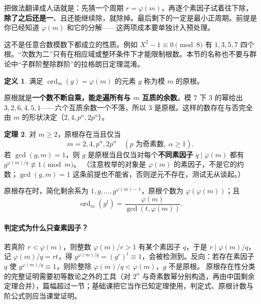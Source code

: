 \documentclass[UTF8,a4paper,11pt,twoside,openright,fontset=fandol]{ctexbook}
\theoremstyle{definition}
\newtheorem{definition}{定义}[chapter]
\newtheorem{theorem}[definition]{定理}
\newcommand{\ord}{\operatorname{ord}}
\begin{document}
\begin{tip}
把做法翻译成人话就是：先猜一个周期 $r=\varphi(m)$，再逐个素因子试着往下除，\textbf{除了之后还是一}、且还能继续除，就除掉。最后剩下的一定是最小正周期。前提是你已经知道 $\varphi(m)$ 和它的分解——这两项成本要单独计入预处理。
\end{tip}


\begin{pitfall}
这不是任意合数模数下都成立的性质。例如 $X^2-1\equiv0\pmod8$ 有 $1,3,5,7$ 四个根。“次数为二”只有在相应域或整环条件下才能限制根数。本节的名称也不要与群论中“子群阶整除群阶”的拉格朗日定理混淆。
\end{pitfall}


\begin{definition}
满足 $\ord_m(g)=\varphi(m)$ 的元素 $g$ 称为模 $m$ 的原根。
\end{definition}

\begin{tip}[原根一句话]
原根就是\textbf{一个数不断自乘，能走遍所有与 $m$ 互质的余数}。模 $7$ 下 $3$ 的幂给出 $3,2,6,4,5,1$——六个互质余数一个不落，所以 $3$ 是原根。这样的数存在与否完全由 $m$ 的形状决定（$2,4,p^\alpha,2p^\alpha$）。
\end{tip}

\begin{theorem}
对 $m\ge2$，原根存在当且仅当
\[
 m=2,4,p^\alpha,2p^\alpha\quad(p\text{ 为奇素数},\ \alpha\ge1).
\]
若 $\gcd(g,m)=1$，则 $g$ 是原根当且仅当对每个\textbf{不同素因子} $q\mid\varphi(m)$ 都有 $g^{\varphi(m)/q}\not\equiv1\pmod m$。
（注意枚举的对象是 $\varphi(m)$ 的素因子，不是它的约数；$\gcd(g,m)=1$ 这条前提也不能省，否则逆元不存在，测试无从谈起。）
\end{theorem}
原根存在时，简化剩余系为 $1,g,\ldots,g^{\varphi(m)-1}$，原根个数为 $\varphi(\varphi(m))$；且
\[
 \ord_m(g^t)=\frac{\varphi(m)}{\gcd(t,\varphi(m))}.
\]

\paragraph{判定式为什么只查素因子？}
若真阶 $r<\varphi(m)$，则整数 $\varphi(m)/r>1$ 有某个素因子 $q$，于是 $r\mid\varphi(m)/q$，记 $\varphi(m)/q=rt$，得 $g^{\varphi(m)/q}=(g^r)^t\equiv1$，会被检测到。反向：若存在素因子 $q$ 使 $g^{\varphi(m)/q}\equiv1$，则阶整除 $\varphi(m)/q<\varphi(m)$，$g$ 不是原根。
原根存在性分类的完整证明需要初等数论之外的工具（对 $2^\alpha$ 与奇素数幂分别构造，再由中国剩余定理合并），篇幅超过一节；基础课把它当作已知定理使用，判定式、原根计数与阶公式则应当课堂证明。
\end{document}
